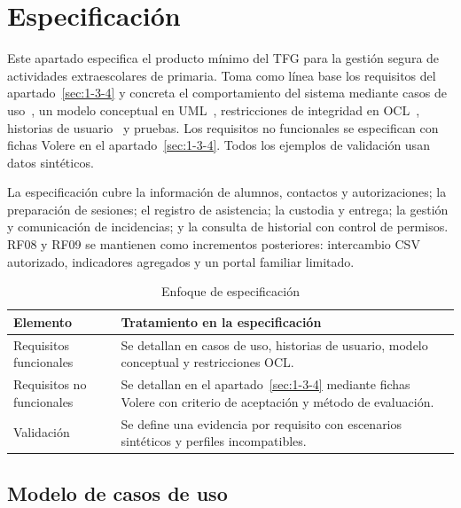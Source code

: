 
\chapter{Especificación}\label{sec:4}

Este apartado especifica el producto mínimo del TFG para la gestión segura de actividades extraescolares de primaria. Toma como línea base los requisitos del apartado~\ref{sec:1-3-4} y concreta el comportamiento del sistema mediante casos de uso~\cite{ref36}, un modelo conceptual en UML~\cite{ref35}, restricciones de integridad en OCL~\cite{ref34}, historias de usuario~\cite{ref38} y pruebas. Los requisitos no funcionales se especifican con fichas Volere en el apartado~\ref{sec:1-3-4}. Todos los ejemplos de validación usan datos sintéticos.

La especificación cubre la información de alumnos, contactos y autorizaciones; la preparación de sesiones; el registro de asistencia; la custodia y entrega; la gestión y comunicación de incidencias; y la consulta de historial con control de permisos. RF08 y RF09 se mantienen como incrementos posteriores: intercambio CSV autorizado, indicadores agregados y un portal familiar limitado.

\begin{table}[H]
\centering\small
\begin{tabularx}{\textwidth}{>{\hsize=0.487\hsize\raggedright\arraybackslash}X>{\hsize=1.513\hsize\raggedright\arraybackslash}X}
\toprule
\rowcolor{cabeceratabla} \textbf{Elemento} & \textbf{Tratamiento en la especificación} \\
\midrule
Requisitos funcionales & Se detallan en casos de uso, historias de usuario, modelo conceptual y restricciones OCL. \\
Requisitos no funcionales & Se detallan en el apartado~\ref{sec:1-3-4} mediante fichas Volere con criterio de aceptación y método de evaluación. \\
Validación & Se define una evidencia por requisito con escenarios sintéticos y perfiles incompatibles. \\
\bottomrule
\end{tabularx}
\caption{Enfoque de especificación}\label{tab:23}
\end{table}

\section{Modelo de casos de uso}\label{sec:4-1}

